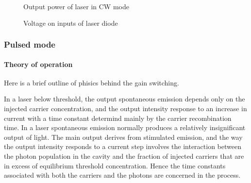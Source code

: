 \begin{figure}[h]
  \centering
  \caption{Output power of laser in CW mode}
  \label{fig:LasCWPow}
\end{figure}

\begin{figure}[h]
   \centering
  \caption{Voltage on inputs of laser diode}
  \label{fig:LasCWVol}
\end{figure}



\subsubsection{Pulsed mode}


\paragraph{Theory of operation}

Here is a brief outline of phisics behind the gain switching.

In a laser below threshold, the output
spontaneous emission depends only on the injected carrier
concentration, and the output intensity response to an increase in
current with a time constant determind mainly by the carrier
recombination time. In a laser spontaneous emission normally produces
a relatively insignificant output of light. The main output derives
from stimulated emission, and the way the output intensity responds to
a current step involves the interaction between the photon population
in the cavity and the fraction of injected carriers that are in excess
of equilibrium threshold concentration. Hence the time constants
associated with both the carriers and the photons are concerned in the
process.

